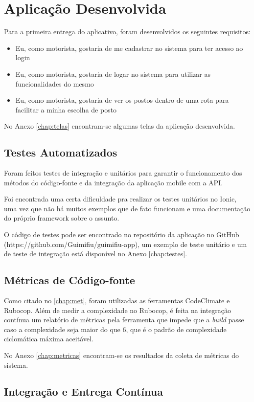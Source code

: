 \section{Aplicação Desenvolvida}
Para a primeira entrega do aplicativo, foram desenvolvidos os seguintes requisitos:
\begin{itemize}
    \item Eu, como motorista, gostaria de me cadastrar no sistema para ter acesso ao login
    \item Eu, como motorista, gostaria de logar no sistema para utilizar as funcionalidades do mesmo
    \item Eu, como motorista, gostaria de ver os postos dentro de uma rota para facilitar a minha escolha de posto
\end{itemize}
No Anexo \ref{chap:telas} encontram-se algumas telas da aplicação desenvolvida.

\subsection{Testes Automatizados}

Foram feitos testes de integração e unitários para garantir o funcionamento dos métodos do código-fonte e da integração da aplicação mobile com a API.

Foi encontrada uma certa dificuldade pra realizar os testes unitários no Ionic, uma vez que não há muitos exemplos que de fato funcionam e uma documentação do próprio framework sobre o assunto.

O código de testes pode ser encontrado no repositório da aplicação no GitHub (https://github.com/Guimifiu/guimifiu-app), um exemplo de teste unitário e um de teste de integração está disponível no Anexo \ref{chap:testes}.

\subsection{Métricas de Código-fonte}

Como citado no \autoref{chap:met}, foram utilizadas as ferramentas CodeClimate e Rubocop. Além de medir a complexidade no Rubocop, é feita na integração contínua um relatório de métricas pela ferramenta que impede que a \textit{build} passe caso a complexidade seja maior do que 6, que é o padrão de complexidade ciclomática máxima aceitável.

No Anexo \ref{chap:metricas} encontram-se os resultados da coleta de métricas do sistema.

\subsection{Integração e Entrega Contínua}

